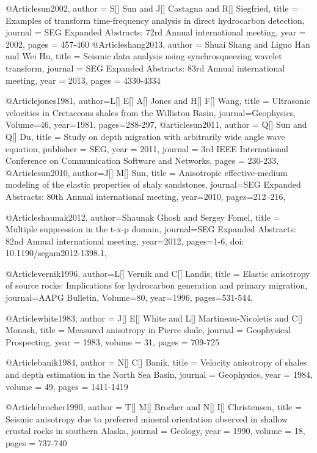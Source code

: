 @Article{sun2002,
  author = 	 {S[] Sun and J[] Castagna and R[] Siegfried},
  title = 	 {Examples of 
   transform time-frequency analysis in direct hydrocarbon detection},
  journal = 	 {SEG Expanded Abstracts: 72rd Annual international meeting},
  year = 	 2002,
  pages = 	 {457-460}
}
@Article{shang2013,
  author = 	 {Shuai Shang and Liguo Han and Wei Hu},
  title = 	 {Seismic data analysis using synchrosqueezing wavelet transform},
  journal = 	 {SEG Expanded Abstracts: 83rd Annual international meeting},
  year = 	 2013,
  pages = 	 {4330-4334}
}

@Article{jones1981,
  author={L[] E[] A[] Jones and H[] F[] Wang},
  title = {Ultrasonic velocities in Cretaceous shales from the Williston Basin},
  journal={Geophysics},
  Volume=46,
  year=1981,
  pages={288-297},
}
@article{sun2011,
  author =	 {Q[] Sun and Q[] Du},
  title =	 {Study on depth migration with arbitrarily wide angle wave equation},
  publisher =	 {SEG},
  year =	 2011,
  journal =	 {3rd IEEE International Conference on Communication Software and Networks},
  pages =	 {230-233},
}
@Article{sun2010,
  author={J[] M[] Sun},
  title = {Anisotropic effective-medium modeling of the elastic properties of shaly sandstones},
  journal={SEG Expanded Abstracts: 80th Annual international meeting},
  year=2010,
  pages={212–216},
}


@Article{shaunak2012,
  author={Shaunak Ghosh and Sergey Fomel},
  title = {Multiple suppression in the t-x-p domain},
  journal={SEG Expanded Abstracts: 82nd Annual international meeting},
  year=2012,
  pages={1-6, doi: 10.1190/segam2012-1398.1},
}

@Article{vernik1996,
  author={L[] Vernik and C[] Landis},
  title = {Elastic anisotropy of source rocks: Implications for hydrocarbon
generation and primary migration},
  journal={AAPG Bulletin},
  Volume=80,
  year=1996,
  pages={531-544},
}

@Article{white1983,
  author = 	 {J[] E[] White and L[] Martineau-Nicoletis and C[] Monash},
  title = 	 {Measured anisotropy in Pierre shale},
  journal = 	 {Geophysical Prospecting},
  year = 	 1983,
  volume =	 31,
  pages =	 {709-725}
}

@Article{banik1984,
  author = 	 {N[] C[] Banik},
  title = 	 {Velocity anisotropy of shales and depth estimation
in the North Sea Basin},
  journal = 	 {Geophysics},
  year = 	 1984,
  volume =	 49,
  pages =	 {1411-1419}
}

@Article{brocher1990,
  author = 	 {T[] M[] Brocher and N[] I[] Christensen},
  title = 	 {Seismic anisotropy due to preferred mineral orientation observed in shallow crustal rocks
in southern Alaska},
  journal = 	 {Geology},
  year = 	 1990,
  volume =	 18,
  pages =	 {737-740}
}


